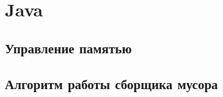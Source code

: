 %
%
%
%
%
%
%
%
%
%
%
%





\section{Java}
\subsection{Управление памятью}
\subsection{Алгоритм работы сборщика мусора}

%
%
%
%
%
%
%
%
%
%
%
%
%
%
%
%
%
%
%
%
%
%
%
%
%
%
%
%
%
%
%
%
%
%
%
%
%






